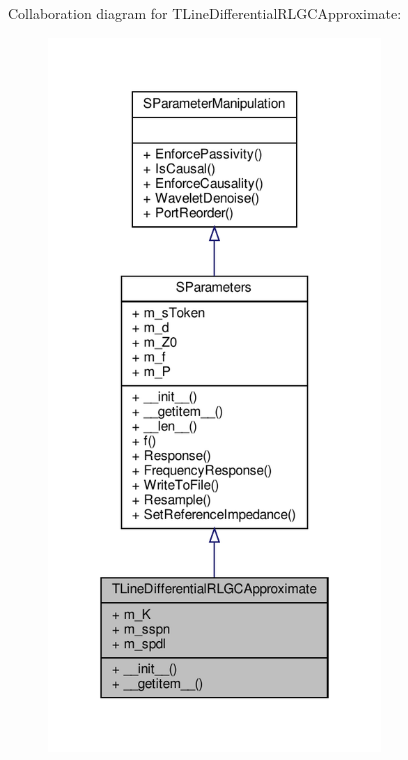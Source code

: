 Collaboration diagram for T\+Line\+Differential\+R\+L\+G\+C\+Approximate\+:
\nopagebreak
\begin{figure}[H]
\begin{center}
\leavevmode
\includegraphics[width=250pt]{classSignalIntegrity_1_1SParameters_1_1Devices_1_1TLineDifferentialRLGCApproximate_1_1TLineDiffe3751d0890de559d29b829445e1292a00}
\end{center}
\end{figure}
